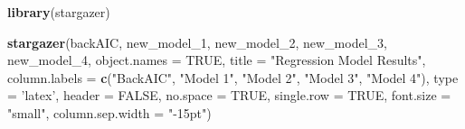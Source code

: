 \documentclass[
]{article}
\newenvironment{Shaded}{\begin{snugshade}}{\end{snugshade}}
\newcommand{\DataTypeTok}[1]{\textcolor[rgb]{0.13,0.29,0.53}{#1}}
\newcommand{\DecValTok}[1]{\textcolor[rgb]{0.00,0.00,0.81}{#1}}
\newcommand{\KeywordTok}[1]{\textcolor[rgb]{0.13,0.29,0.53}{\textbf{#1}}}
\newcommand{\NormalTok}[1]{#1}
\newcommand{\OtherTok}[1]{\textcolor[rgb]{0.56,0.35,0.01}{#1}}
\newcommand{\StringTok}[1]{\textcolor[rgb]{0.31,0.60,0.02}{#1}}
\begin{document}
\begin{Shaded}
\begin{Highlighting}[]
\KeywordTok{library}\NormalTok{(stargazer)}

\KeywordTok{stargazer}\NormalTok{(backAIC, new_model_}\DecValTok{1}\NormalTok{, new_model_}\DecValTok{2}\NormalTok{, new_model_}\DecValTok{3}\NormalTok{, new_model_}\DecValTok{4}\NormalTok{, }\DataTypeTok{object.names =} \OtherTok{TRUE}\NormalTok{, }
          \DataTypeTok{title =} \StringTok{"Regression Model Results"}\NormalTok{, }\DataTypeTok{column.labels =} 
            \KeywordTok{c}\NormalTok{(}\StringTok{"BackAIC"}\NormalTok{, }\StringTok{"Model 1"}\NormalTok{, }\StringTok{"Model 2"}\NormalTok{, }
              \StringTok{"Model 3"}\NormalTok{, }\StringTok{"Model 4"}\NormalTok{), }\DataTypeTok{type =} \StringTok{'latex'}\NormalTok{, }
          \DataTypeTok{header =} \OtherTok{FALSE}\NormalTok{, }\DataTypeTok{no.space =} \OtherTok{TRUE}\NormalTok{, }\DataTypeTok{single.row =} \OtherTok{TRUE}\NormalTok{, }
          \DataTypeTok{font.size =} \StringTok{"small"}\NormalTok{, }\DataTypeTok{column.sep.width =} \StringTok{"-15pt"}\NormalTok{)}
\end{Highlighting}
\end{Shaded}
\end{document}
